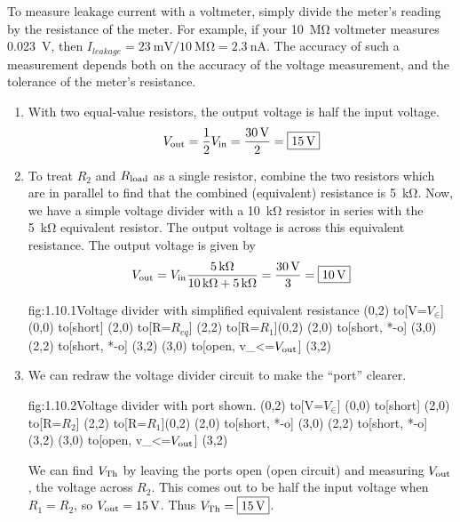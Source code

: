 To measure leakage current with a voltmeter, simply divide the meter's reading by the resistance of the meter.  For example, if your \SI{10}{\Mohm} voltmeter measures \SI{0.023}{\V}, then $I_{leakage} = \SI{23}{\mV} / \SI{10}{\Mohm} = \SI{2.3}{\nA}$.  The accuracy of such a measurement depends both on the accuracy of the voltage measurement, and the tolerance of the meter's resistance.

\begin{enumerate}
    \item 
    With two equal-value resistors, the output voltage is half the input voltage.
    \[V_\out = \frac{1}{2}V_\in = \frac{\SI{30}{\V}}{2} = \mans{\SI{15}{\V}}\]

    \item 
    To treat $R_2$ and $R_{\text{load}}$ as a single resistor, combine the two resistors which are in parallel to find that the combined (equivalent) resistance is \SI{5}{\kohm}. Now, we have a simple voltage divider with a \SI{10}{\kohm} resistor in series with the \SI{5}{\kohm} equivalent resistor. The output voltage is across this equivalent resistance. The output voltage is given by 
    \[V_\out = V_{\in} \frac{\SI{5}{\kohm}}{\SI{10}{\kohm} + \SI{5}{\kohm}} = \frac{\SI{30}{\V}}{3} = \mans{\SI{10}{\V}} \]
    \begin{circuit}{fig:1.10.1}{Voltage divider with simplified equivalent resistance}
        (0,2) to[V=$V_{\in}$] (0,0)
        to[short] (2,0)
        to[R=$R_{eq}$] (2,2)
        to[R=$R_1$](0,2)
        (2,0) to[short, *-o] (3,0)
        (2,2) to[short, *-o] (3,2)
        (3,0) to[open, v_<=$V_{\text{out}}$] (3,2)
    \end{circuit}

    \item 
    We can redraw the voltage divider circuit to make the ``port'' clearer. 
    \begin{circuit}{fig:1.10.2}{Voltage divider with port shown.}
        (0,2) to[V=$V_\in$] (0,0)
        to[short] (2,0)
        to[R=$R_2$] (2,2)
        to[R=$R_1$](0,2)
        (2,0) to[short, *-o] (3,0)
        (2,2) to[short, *-o] (3,2)
        (3,0) to[open, v_<=$V_{\text{out}}$] (3,2)
    \end{circuit}

    We can find $V_{\text{Th}}$ by leaving the ports open (open circuit) and measuring $V_{\text{out}}$, the voltage across $R_2$. This comes out to be half the input voltage when $R_1 = R_2$, so $V_\out = \SI{15}{\V}$. Thus $V_{\Th} = \mans{\SI{15}{\V}}$.
    

\end{enumerate}
